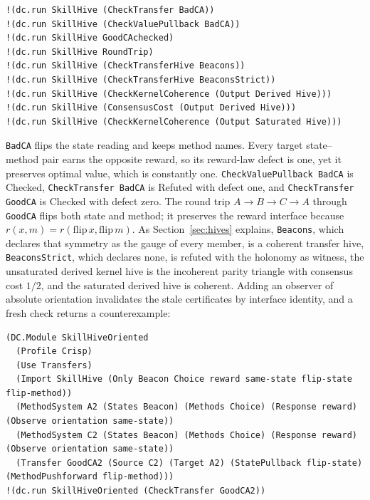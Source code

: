 \documentclass[11pt]{article}
\newcommand{\code}[1]{\texttt{#1}}
\theoremstyle{definition}
\theoremstyle{plain}
\begin{document}
\begin{lstlisting}[basicstyle=\ttfamily\footnotesize,title={\scriptsize\ttfamily fixtures/skill\_hive.metta}]
!(dc.run SkillHive (CheckTransfer BadCA))
!(dc.run SkillHive (CheckValuePullback BadCA))
!(dc.run SkillHive GoodCAchecked)
!(dc.run SkillHive RoundTrip)
!(dc.run SkillHive (CheckTransferHive Beacons))
!(dc.run SkillHive (CheckTransferHive BeaconsStrict))
!(dc.run SkillHive (CheckKernelCoherence (Output Derived Hive)))
!(dc.run SkillHive (ConsensusCost (Output Derived Hive)))
!(dc.run SkillHive (CheckKernelCoherence (Output Saturated Hive)))
\end{lstlisting}

\code{BadCA} flips the state reading and keeps method names. Every target state--method pair earns
the opposite reward, so its reward-law defect is one, yet it preserves optimal value, which is
constantly one. \code{CheckValuePullback BadCA} is Checked, \code{CheckTransfer BadCA} is Refuted
with defect one, and \code{CheckTransfer GoodCA} is Checked with defect zero. The round trip
$A\to B\to C\to A$ through \code{GoodCA} flips both state and method; it preserves the reward
interface because $r(x,m)=r(\mathrm{flip}\,x,\mathrm{flip}\,m)$. As Section~\ref{sec:hives}
explains, \code{Beacons}, which declares that symmetry as the gauge of every member, is a coherent
transfer hive, \code{BeaconsStrict}, which declares none, is refuted with the holonomy as witness,
the unsaturated derived kernel hive is the incoherent parity triangle with consensus cost $1/2$, and
the saturated derived hive is coherent. Adding an observer of absolute orientation invalidates the
stale certificates by interface identity, and a fresh check returns a counterexample:
\begin{lstlisting}[basicstyle=\ttfamily\footnotesize,title={\scriptsize\ttfamily fixtures/skill\_hive.metta}]
(DC.Module SkillHiveOriented
  (Profile Crisp)
  (Use Transfers)
  (Import SkillHive (Only Beacon Choice reward same-state flip-state flip-method))
  (MethodSystem A2 (States Beacon) (Methods Choice) (Response reward) (Observe orientation same-state))
  (MethodSystem C2 (States Beacon) (Methods Choice) (Response reward) (Observe orientation same-state))
  (Transfer GoodCA2 (Source C2) (Target A2) (StatePullback flip-state) (MethodPushforward flip-method)))
!(dc.run SkillHiveOriented (CheckTransfer GoodCA2))
\end{lstlisting}
\end{document}
